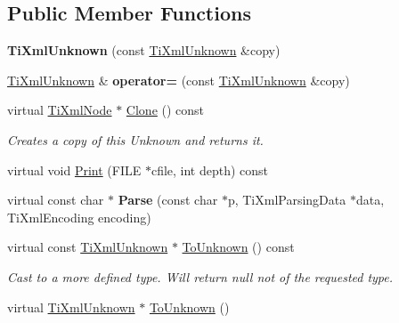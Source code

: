 \subsection*{Public Member Functions}
\begin{DoxyCompactItemize}
\item 
\hypertarget{class_ti_xml_unknown_abe798ff4feea31474850c7f0de6bdf5e}{{\bfseries Ti\-Xml\-Unknown} (const \hyperlink{class_ti_xml_unknown}{Ti\-Xml\-Unknown} \&copy)}\label{class_ti_xml_unknown_abe798ff4feea31474850c7f0de6bdf5e}

\item 
\hypertarget{class_ti_xml_unknown_a60560b5aacb4bdc8b2b5f02f0a99c5c0}{\hyperlink{class_ti_xml_unknown}{Ti\-Xml\-Unknown} \& {\bfseries operator=} (const \hyperlink{class_ti_xml_unknown}{Ti\-Xml\-Unknown} \&copy)}\label{class_ti_xml_unknown_a60560b5aacb4bdc8b2b5f02f0a99c5c0}

\item 
\hypertarget{class_ti_xml_unknown_a0960bb7428b3f341da46244229604d73}{virtual \hyperlink{class_ti_xml_node}{Ti\-Xml\-Node} $\ast$ \hyperlink{class_ti_xml_unknown_a0960bb7428b3f341da46244229604d73}{Clone} () const }\label{class_ti_xml_unknown_a0960bb7428b3f341da46244229604d73}

\begin{DoxyCompactList}\small\item\em Creates a copy of this Unknown and returns it. \end{DoxyCompactList}\item 
virtual void \hyperlink{class_ti_xml_unknown_a31ba089a40fb5a1869750fce09b0bacb}{Print} (F\-I\-L\-E $\ast$cfile, int depth) const 
\item 
\hypertarget{class_ti_xml_unknown_a0d0a0f8ec748f12bd1dc3ef6d64d7c87}{virtual const char $\ast$ {\bfseries Parse} (const char $\ast$p, Ti\-Xml\-Parsing\-Data $\ast$data, Ti\-Xml\-Encoding encoding)}\label{class_ti_xml_unknown_a0d0a0f8ec748f12bd1dc3ef6d64d7c87}

\item 
\hypertarget{class_ti_xml_unknown_ab0313e5fe77987d746ac1a97a254419d}{virtual const \hyperlink{class_ti_xml_unknown}{Ti\-Xml\-Unknown} $\ast$ \hyperlink{class_ti_xml_unknown_ab0313e5fe77987d746ac1a97a254419d}{To\-Unknown} () const }\label{class_ti_xml_unknown_ab0313e5fe77987d746ac1a97a254419d}

\begin{DoxyCompactList}\small\item\em Cast to a more defined type. Will return null not of the requested type. \end{DoxyCompactList}\item 
\hypertarget{class_ti_xml_unknown_a67c9fd22940e8c47f706a72cdd2e332c}{virtual \hyperlink{class_ti_xml_unknown}{Ti\-Xml\-Unknown} $\ast$ \hyperlink{class_ti_xml_unknown_a67c9fd22940e8c47f706a72cdd2e332c}{To\-Unknown} ()}\label{class_ti_xml_unknown_a67c9fd22940e8c47f706a72cdd2e332c}


\end{DoxyCompactItemize}
